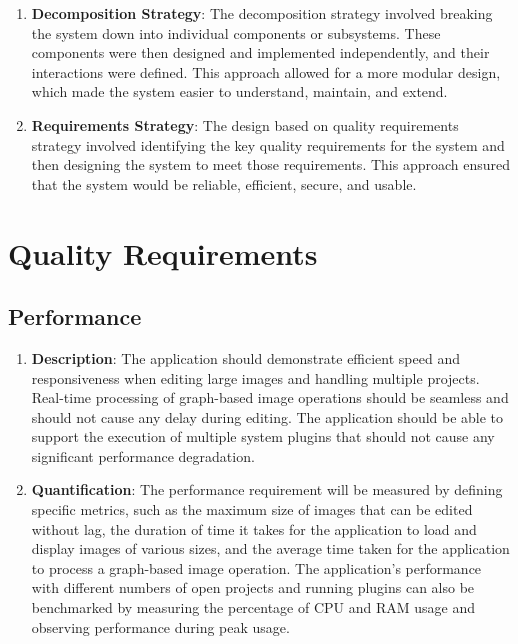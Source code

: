 \documentclass[11pt,a4paper]{article}
\begin{document}
\begin{enumerate}[label*=\arabic*.]
	\item[\textbullet] {\bf Decomposition Strategy}: The decomposition strategy
	involved breaking the system down into individual components or subsystems.
	These components were then designed and implemented independently, and their
	interactions were defined. This approach allowed for a more modular design,
	which made the system easier to understand, maintain, and extend.

	\item[\textbullet] {\bf Requirements Strategy}: The design based on quality
	requirements strategy involved identifying the key quality requirements for
	the system and then designing the system to meet those requirements. This
	approach ensured that the system would be reliable, efficient, secure, and
	usable.
\end{enumerate}

\section{Quality Requirements}

\subsection{Performance}

\begin{enumerate}[label*=\arabic*.]
	\item[\textbullet] {\bf Description}: The application should demonstrate
	efficient speed and responsiveness when editing large images and handling
	multiple projects. Real-time processing of graph-based image operations
	should be seamless and should not cause any delay during editing. The
	application should be able to support the execution of multiple system
	plugins that should not cause any significant performance degradation.

	\item[\textbullet] {\bf Quantification}: The performance requirement will be
	measured by defining specific metrics, such as the maximum size of images
	that can be edited without lag, the duration of time it takes for the
	application to load and display images of various sizes, and the average
	time taken for the application to process a graph-based image operation. The
	application's performance with different numbers of open projects and
	running plugins can also be benchmarked by measuring the percentage of CPU
	and RAM usage and observing performance during peak usage.
\end{enumerate}
\end{document}
